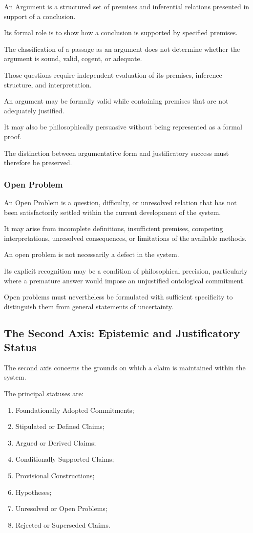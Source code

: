 An Argument is a structured
set of premises and
inferential relations
presented in support
of a conclusion.

Its formal role
is to show how
a conclusion is
supported by
specified premises.

The classification
of a passage as
an argument does
not determine whether
the argument is
sound, valid,
cogent, or adequate.

Those questions
require independent
evaluation of its
premises, inference
structure, and
interpretation.

An argument may
be formally valid
while containing
premises that are
not adequately
justified.

It may also be
philosophically
persuasive without
being represented
as a formal proof.

The distinction
between argumentative
form and justificatory
success must therefore
be preserved.

\subsubsection{Open Problem}

An Open Problem
is a question,
difficulty, or
unresolved relation
that has not been
satisfactorily settled
within the current
development of the
system.

It may arise from
incomplete definitions,
insufficient premises,
competing interpretations,
unresolved consequences,
or limitations of
the available methods.

An open problem
is not necessarily
a defect in the
system.

Its explicit recognition
may be a condition
of philosophical
precision, particularly
where a premature
answer would impose
an unjustified
ontological commitment.

Open problems
must nevertheless
be formulated
with sufficient
specificity to
distinguish them
from general
statements of
uncertainty.

\subsection{The Second Axis: Epistemic and Justificatory Status}

The second axis concerns
the grounds on which
a claim is maintained
within the system.

The principal statuses
are:

\begin{enumerate}
    \item Foundationally Adopted Commitments;
    \item Stipulated or Defined Claims;
    \item Argued or Derived Claims;
    \item Conditionally Supported Claims;
    \item Provisional Constructions;
    \item Hypotheses;
    \item Unresolved or Open Problems;
    \item Rejected or Superseded Claims.
\end{enumerate}

